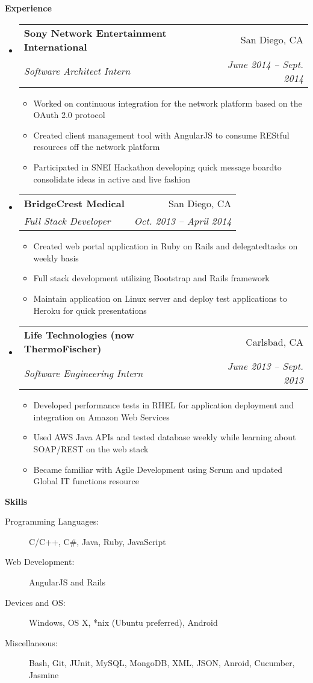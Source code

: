 \documentclass[letterpaper,11pt]{article}
\makeatletter
\newcommand{\resitem}[1]{\item #1 \vspace{-2pt}}
\newcommand{\resheading}[1]{{\large \colorbox{mygrey}{\begin{minipage}{\textwidth}{\textbf{#1 \vphantom{p\^{E}}}}\end{minipage}}}}
\newcommand{\ressubheading}[4]{
\begin{tabular*}{6.5in}{l@{\extracolsep{\fill}}r}
		\textbf{#1} & #2 \\
		\textit{#3} & \textit{#4} \\
\end{tabular*}\vspace{-6pt}}
\makeatother
\begin{document}
\resheading{Experience}
  \begin{itemize}
    \item 
    \ressubheading{Sony Network Entertainment International}{San Diego, CA}{Software Architect Intern}{June 2014 -- Sept. 2014}
    { \footnotesize
      \begin{itemize}
        \resitem{Worked on continuous integration for the network platform based on the OAuth 2.0 protocol}
	\resitem{Created client management tool with AngularJS to consume REStful resources off the network platform}
        \resitem{Participated in SNEI Hackathon developing quick message boardto consolidate ideas in active and live fashion}
      \end{itemize}
    }
    \item
    \ressubheading{BridgeCrest Medical}{San Diego, CA}{Full Stack Developer}{Oct. 2013 -- April 2014}
    { \footnotesize
      \begin{itemize}
	\resitem{Created web portal application in Ruby on Rails and delegatedtasks on weekly basis}
	\resitem{Full stack development utilizing Bootstrap and Rails
framework}	
        \resitem{Maintain application on Linux server and deploy test applications to Heroku for quick presentations}
      \end{itemize}
    }
    \item
    \ressubheading{Life Technologies (now ThermoFischer)}{Carlsbad, CA}{Software Engineering Intern}{June 2013 -- Sept. 2013}
    { \footnotesize
      \begin{itemize}
	\resitem{Developed performance tests in RHEL for application deployment and integration on Amazon Web Services}
	\resitem{Used AWS Java APIs and tested database weekly while learning about SOAP/REST on the web stack}
	\resitem{Became familiar with Agile Development using Scrum and updated Global IT functions resource}
      \end{itemize}
    }
  \end{itemize}  %

\resheading{Skills}
  \begin{description}
    \item[Programming Languages:]
    { \footnotesize
      C/C++, C\#, Java, Ruby, JavaScript
    }
    \item[Web Development:]
    { \footnotesize
      AngularJS and Rails
    }
    \item[Devices and OS:]
    { \footnotesize
      Windows, OS X, *nix (Ubuntu preferred), Android
    }
    \item[Miscellaneous:]
    { \footnotesize
      Bash, Git, JUnit, MySQL, MongoDB, XML, JSON, Anroid, Cucumber, Jasmine
    }
  \end{description} %
\end{document}
